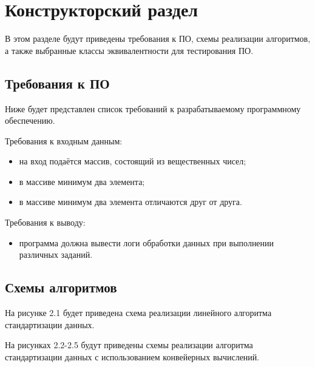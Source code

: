 \chapter{Конструкторский раздел}
В этом разделе будут приведены требования к ПО, схемы реализации алгоритмов,
а также выбранные классы эквивалентности для тестирования ПО.

\section{Требования к ПО}
Ниже будет представлен список требований к разрабатываемому программному обеспечению. 

Требования к входным данным: 
\begin{itemize}
	\item на вход подаётся массив, состоящий из вещественных чисел;
	\item в массиве минимум два элемента;
	\item в массиве минимум два элемента отличаются друг от друга.
\end{itemize}

Требования к выводу: 
\begin{itemize}
	\item программа должна вывести логи обработки данных при выполнении различных заданий.
\end{itemize}

\section{Схемы алгоритмов}
На рисунке 2.1 будет приведена схема реализации линейного алгоритма стандартизации данных.

На рисунках 2.2-2.5 будут приведены схемы реализации алгоритма стандартизации данных с использованием конвейерных вычислений.

